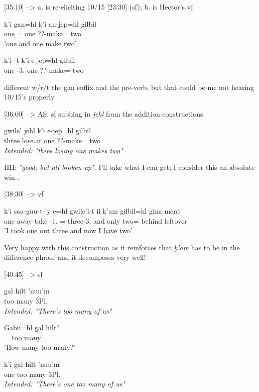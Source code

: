 [35:10] --> a. is re-eliciting 10/15 [23:30] (sf); b. is Hector's vf
\begin{exe}
\ex \begin{xlist}
\item \gll k'i g̱an=hl k'i an-jep=hl gilbil\\
one \Pcnj{}=\Cn{} one ??-make=\Cn{} two\\
'one and one make two'
\item \gll k'i -t k'i e-jep=hl gilbil\\
one \Pcnj{}-3.\I{} one ??-make=\Cn{} two\\
\end{xlist}
\end{exe}

different w/r/t the g̱an suffix and the pre-verb, but that could be me not hearing 10/15's properly

[36:00] --> AS: sf subbing in \textit{jehl} from the addition constructions.
\begin{exe}
    \ex \gll * gwile' jehl k'i e-jep=hl gilbil\\
   {} three lose.at one ??-make=\Cn{} two\\
    \textit{Intended: "three losing one makes two"}
\end{exe}

HH: \textit{"good, but all broken up"}. I'll take what I can get; I consider this an absolute win...

[38:30] --> vf
\begin{exe}
\ex \gll k'i saa-guu-t-'y e=hl gwile'l-t ii ḵ'am gilbil=hl gina ment\\
one away-take-\Trn{}-1.\Ii{} \Prep{}=\Cn{} three-3.\Ii{} and only two=\Cn{} behind leftover\\
'I took one out three and now I have two'
\end{exe}

Very happy with this construction as it reinforces that \textit{ḵ'am} has to be in the difference phrase and it decomposes very well!

[40:45] --> sf
\begin{exe}
\ex \begin{xlist}
\item \gll g̱al hilt 'nuu'm\\
too many 3Pl.\Iii{}\\
\textit{Intended: "There's too many of us"}
\item \gll Gabii=hl g̱al hilt?\\
\Mass{}=\Cn{} too many\\
'How many too many?'
\item \gll k'i g̱al hilt 'nuu'm\\
one too many 3Pl.\Iii{}\\
\textit{Intended: "There's one too many of us"}
\end{xlist}
\end{exe}


